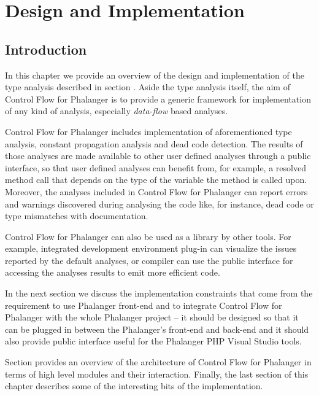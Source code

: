 \chapter{Design and Implementation}

    \section{Introduction}
    
    In this chapter we provide an overview of the design and 
    implementation of the type analysis described in 
    section . Aside the type analysis 
    itself, the aim of Control Flow for Phalanger is to provide 
    a generic framework for implementation of any kind 
    of analysis, especially \emph{data-flow} based analyses.
    
    Control Flow for Phalanger includes implementation of 
    aforementioned type analysis, constant propagation analysis 
    and dead code detection. The results of those analyses 
    are made available to other user defined analyses 
    through a public interface, so that user defined analyses 
    can benefit from, for example, a resolved method call 
    that depends on the type of the variable the method 
    is called upon. Moreover, the analyses included in 
    Control Flow for Phalanger can report errors and warnings 
    discovered during analysing the code like, for instance, 
    dead code or type mismatches with documentation.
    
    Control Flow for Phalanger can also be used as a 
    library by other tools. For example, integrated 
    development environment plug-in can visualize the 
    issues reported by the default analyses, or compiler 
    can use the public interface for accessing the 
    analyses results to emit more efficient code.
    
    In the next section we discuss the implementation 
    constraints that come from the requirement to use 
    Phalanger front-end and to integrate Control Flow 
    for Phalanger with the whole Phalanger project -- 
    it should be designed so that it can be plugged 
    in between the Phalanger's front-end and back-end 
    and it should also provide public interface useful 
    for the Phalanger PHP Visual Studio tools.
    
    Section  provides an overview 
    of the architecture of Control Flow for Phalanger in 
    terms of high level modules and their interaction. 
    Finally, the last section of this chapter describes 
    some of the interesting bits of the implementation.
    
